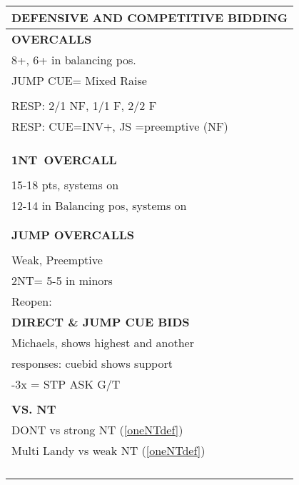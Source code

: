 \documentclass{article}
\newcommand\N{{\footnotesize NT}}
\begin{document}
\noindent
\small{
\begin{minipage}{90mm}
	\begin{tabular}{| p{88mm} |}
		\hline
		\cellcolor[gray]{0.9} \textbf{DEFENSIVE AND COMPETITIVE BIDDING} \\ \hline
		\textbf{OVERCALLS} \\ \hline
                8+, 6+ in balancing pos.
		\\ JUMP CUE= Mixed Raise
                \\ \hline
		\\ \hline
                RESP: 2/1 NF, 1/1 F, 2/2 F
		\\ \hline
                RESP: CUE=INV+, JS =preemptive (NF)
		\\ \hline
		\\ \hline
		\\ \hline
		\\ \hline
		\textbf{1\N \ OVERCALL} \\ \hline
		\\ \hline
                15-18 pts, systems on
		\\ \hline
                12-14 in Balancing pos, systems on
		\\ \hline
		\\ \hline
		\\ \hline
		\textbf{JUMP OVERCALLS} \\ \hline
		\\ \hline
                Weak, Preemptive
		\\ \hline
                2NT= 5-5 in minors
		\\ \hline
		Reopen: \\ \hline
		\textbf{DIRECT \& JUMP CUE BIDS} \\ \hline
                Michaels, shows highest and another
		\\ \hline
                responses: cuebid shows support
		\\ \hline
                [2x]-3x = STP ASK G/T 
		\\ \hline
		\\ \hline
		\textbf{VS. NT} \\ \hline
                DONT vs strong NT (\ref{oneNTdef})
		\\ \hline
                Multi Landy vs weak NT (\ref{oneNTdef})
		\\ \hline
		\\ \hline
		\\ \hline
		\\ \hline
		\\ \hline

\end{tabular}
\end{minipage}}
\end{document}
